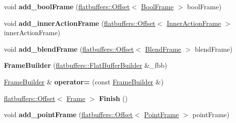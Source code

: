\begin{DoxyCompactItemize}
\item 
\mbox{\label{structflatbuffers_1_1FrameBuilder_a8140165f5941b16659951f300524b0aa}} 
void {\bfseries add\+\_\+bool\+Frame} (\hyperlink{structflatbuffers_1_1Offset}{flatbuffers\+::\+Offset}$<$ \hyperlink{structflatbuffers_1_1BoolFrame}{Bool\+Frame} $>$ bool\+Frame)
\item 
\mbox{\label{structflatbuffers_1_1FrameBuilder_ab7cbda0e5e072f6fc510f7ed0fb94c68}} 
void {\bfseries add\+\_\+inner\+Action\+Frame} (\hyperlink{structflatbuffers_1_1Offset}{flatbuffers\+::\+Offset}$<$ \hyperlink{structflatbuffers_1_1InnerActionFrame}{Inner\+Action\+Frame} $>$ inner\+Action\+Frame)
\item 
\mbox{\label{structflatbuffers_1_1FrameBuilder_a811300c49444ee73e33c4190139c139a}} 
void {\bfseries add\+\_\+blend\+Frame} (\hyperlink{structflatbuffers_1_1Offset}{flatbuffers\+::\+Offset}$<$ \hyperlink{structflatbuffers_1_1BlendFrame}{Blend\+Frame} $>$ blend\+Frame)
\item 
\mbox{\label{structflatbuffers_1_1FrameBuilder_ab617cdaf3a4c5586badbf0e6a63e2808}} 
{\bfseries Frame\+Builder} (\hyperlink{classflatbuffers_1_1FlatBufferBuilder}{flatbuffers\+::\+Flat\+Buffer\+Builder} \&\+\_\+fbb)
\item 
\mbox{\label{structflatbuffers_1_1FrameBuilder_ad17c97d77856e1eb1d7fbbd66615ec73}} 
\hyperlink{structflatbuffers_1_1FrameBuilder}{Frame\+Builder} \& {\bfseries operator=} (const \hyperlink{structflatbuffers_1_1FrameBuilder}{Frame\+Builder} \&)
\item 
\mbox{\label{structflatbuffers_1_1FrameBuilder_a03e14d2b7f067f84cea651d1a5c2e469}} 
\hyperlink{structflatbuffers_1_1Offset}{flatbuffers\+::\+Offset}$<$ \hyperlink{structflatbuffers_1_1Frame}{Frame} $>$ {\bfseries Finish} ()
\item 
\mbox{\label{structflatbuffers_1_1FrameBuilder_a35c3aba0c332570d1799e397ddbb878a}} 
void {\bfseries add\+\_\+point\+Frame} (\hyperlink{structflatbuffers_1_1Offset}{flatbuffers\+::\+Offset}$<$ \hyperlink{structflatbuffers_1_1PointFrame}{Point\+Frame} $>$ point\+Frame)

\end{DoxyCompactItemize}
